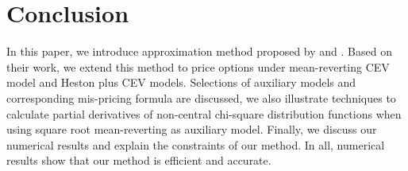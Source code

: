 \chapter{Conclusion}

In this paper, we introduce approximation method proposed by \cite{david_variance_nodate} and \cite{kristensen_adding_2011}. Based on their work, we extend this method to price options under mean-reverting CEV model and Heston plus CEV models. Selections of auxiliary models and corresponding mis-pricing formula are discussed, we also illustrate techniques to calculate partial derivatives of non-central chi-square distribution functions when using square root mean-reverting as auxiliary model. Finally, we discuss our numerical results and explain the constraints of our method. In all, numerical results show that our method is efficient and accurate.